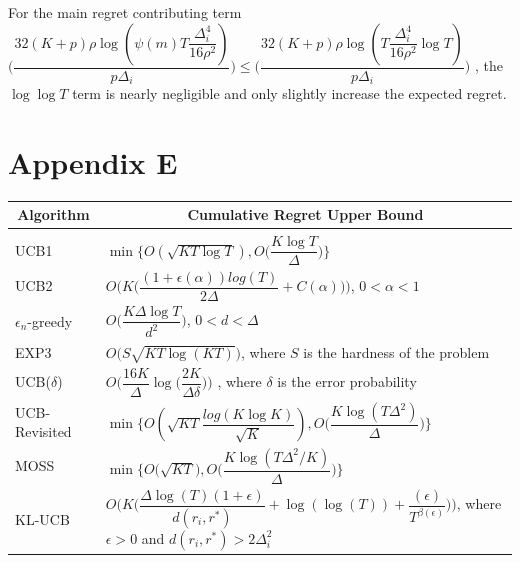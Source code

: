 	For the main regret contributing term $\bigg(\dfrac{32(K+p)\rho\log{(\psi(m)T\dfrac{\Delta_{i}^{4}}{16\rho^{2}})}}{p\Delta_{i}}\bigg) \leq \bigg(\dfrac{32(K+p)\rho\log{(T\dfrac{\Delta_{i}^{4}}{16\rho^{2}}\log T)}}{p\Delta_{i}}\bigg)$ , the $\log \log T$ term is nearly negligible and only slightly increase the expected regret.


\section{Appendix E}
\label{sample-table}
\begin{center}
\begin{tabular}{ll}
\multicolumn{1}{c}{\bf Algorithm}  &\multicolumn{1}{c}{\bf Cumulative Regret Upper Bound} \\
\hline \\
UCB1         &\hspace*{5em}$\min\bigg\lbrace O(\sqrt{KT\log T}) ,O\bigg(\dfrac{K\log T}{\Delta}\bigg)\bigg\rbrace$ \\
UCB2         &\hspace*{5em}$O\bigg(K\bigg(\dfrac{(1 + \epsilon(\alpha)) log(T)}{2\Delta} + C(\alpha)\bigg)\bigg)$, $0<\alpha<1$ \\
$\epsilon_{n}$-greedy         &\hspace*{5em}$O\bigg(\dfrac{K\Delta\log T}{d^{2}}\bigg)$, $0<d<\Delta$ \\
EXP3             &\hspace*{5em}$O\bigg(S \sqrt{KT \log(KT)}\bigg)$, where $S$ is the hardness of the problem \\
UCB($\delta$)	&\hspace*{5em}$O\bigg(\dfrac{16K}{\Delta}\log\big(\dfrac{2K}{\Delta\delta}\big)\bigg)$ , where $\delta$ is the error probability\\
UCB-Revisited             &\hspace*{5em}$\min\bigg\lbrace O(\sqrt{KT}\dfrac{log(K\log K)}{\sqrt{K}}), O\bigg(\dfrac{K\log (T\Delta^{2})}{\Delta}\bigg)\bigg\rbrace$ \\
MOSS				&\hspace*{5em}$\min\bigg\lbrace O\bigg(\sqrt{KT}\bigg), O\bigg(\dfrac{K\log(T\Delta^{2}/K)}{\Delta}\bigg) \bigg \rbrace$\\
KL-UCB         &\hspace*{5em}$O\bigg(K\bigg(\dfrac{\Delta \log(T)(1 + \epsilon)}{d(r_{i}, r^{*} )} + \log(\log(T)) + \dfrac{(\epsilon)}{T^{\beta(\epsilon)}}\bigg)\bigg)$, where $\epsilon > 0$ and $d(r_{i}, r^{*})>2\Delta_{i}^{2}$\\

\end{tabular}
\end{center}
